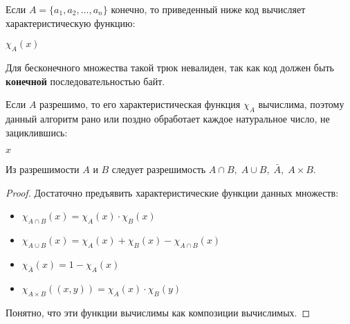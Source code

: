 \documentclass[a4paper, fleqn]{article}
\begin{document}
        Если $A = \{a_1, a_2, \dots, a_n\}$ конечно, то приведенный ниже код вычисляет характеристическую функцию:

        \begin{algorithmic}
        \ENSURE $\chi_A(x)$
            \ELSE
            \ENDIF
        \end{algorithmic}


        Для бесконечного множества такой трюк невалиден, так как код должен быть \textbf{конечной} последовательностью байт.

        Если $A$ разрешимо, то его характеристическая функция $\chi_A$ вычислима, поэтому данный алгоритм рано или поздно обработает каждое натуральное число, не зациклившись:

        \begin{algorithmic}
                    \PRINT $x$
                \ENDIF
            \ENDFOR
        \end{algorithmic}


        \begin{proposition}
            Из разрешимости $A$ и $B$ следует разрешимость $A \cap B, \; A \cup B, \; \bar A, \; A \times B$.
        \end{proposition}

        \begin{proof}
        Достаточно предъявить характеристические функции данных множеств:

        \begin{itemize}
            \item $\chi_{A \cap B}(x) = \chi_{A}(x) \cdot \chi_B(x)$
            \item $\chi_{A \cup B}(x) = \chi_{A}(x) + \chi_B(x) - \chi_{A \cap B}(x)$
            \item $\chi_{\bar A}(x) = 1 - \chi_{A}(x)$
            \item $\chi_{A \times B}((x, y)) = \chi_A(x) \cdot \chi_B(y)$
        \end{itemize}

        Понятно, что эти функции вычислимы как композиции вычислимых.
        \end{proof}
\end{document}
